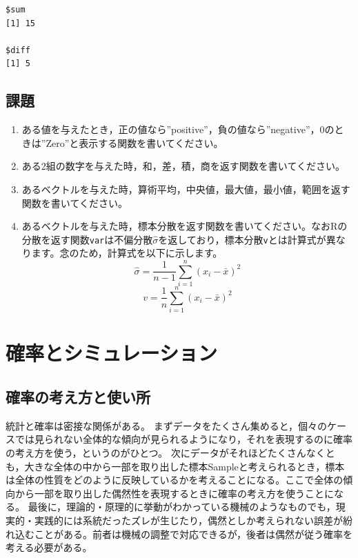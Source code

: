\documentclass[
  a4paper,
]{ltjsbook}
\providecommand{\tightlist}{%
  \setlength{\itemsep}{0pt}\setlength{\parskip}{0pt}}
\begin{document}
\begin{verbatim}
$sum
[1] 15

$diff
[1] 5
\end{verbatim}

\section{課題}\label{ux8ab2ux984c-3}

\begin{enumerate}
\def\labelenumi{\arabic{enumi}.}
\tightlist
\item
  ある値を与えたとき，正の値なら''positive''，負の値なら''negative''，0のときは''Zero''と表示する関数を書いてください。
\item
  ある2組の数字を与えた時，和，差，積，商を返す関数を書いてください。
\item
  あるベクトルを与えた時，算術平均，中央値，最大値，最小値，範囲を返す関数を書いてください。
\item
  あるベクトルを与えた時，標本分散を返す関数を書いてください。なおRの分散を返す関数\texttt{var}は不偏分散\(\hat{\sigma}\)を返しており，標本分散\texttt{v}とは計算式が異なります。念のため，計算式を以下に示します。
  \[\hat{\sigma} = \frac{1}{n-1}\sum_{i=1}^n (x_i - \bar{x})^2 \]
  \[v= \frac{1}{n}\sum_{i=1}^n (x_i - \bar{x})^2 \]
\end{enumerate}


\chapter{確率とシミュレーション}\label{ux78baux7387ux3068ux30b7ux30dfux30e5ux30ecux30fcux30b7ux30e7ux30f3}

\section{確率の考え方と使い所}\label{ux78baux7387ux306eux8003ux3048ux65b9ux3068ux4f7fux3044ux6240}

統計と確率は密接な関係がある。
まずデータをたくさん集めると，個々のケースでは見られない全体的な傾向が見られるようになり，それを表現するのに確率の考え方を使う，というのがひとつ。
次にデータがそれほどたくさんなくとも，大きな全体の中から一部を取り出した標本Sampleと考えられるとき，標本は全体の性質をどのように反映しているかを考えることになる。ここで全体の傾向から一部を取り出した偶然性を表現するときに確率の考え方を使うことになる。
最後に，理論的・原理的に挙動がわかっている機械のようなものでも，現実的・実践的には系統だったズレが生じたり，偶然としか考えられない誤差が紛れ込むことがある。前者は機械の調整で対応できるが，後者は偶然が従う確率を考える必要がある。
\end{document}
